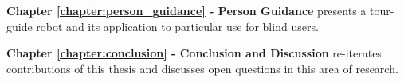 \documentclass[12pt]{gatech-thesis}
\begin{document}
\textbf{Chapter \ref{chapter:person_guidance} - Person Guidance} presents a tour-guide robot and its application to particular use for blind users.

\textbf{Chapter \ref{chapter:conclusion} - Conclusion and Discussion} re-iterates contributions of this thesis and discusses open questions in this area of research.



%
%
\end{document}
